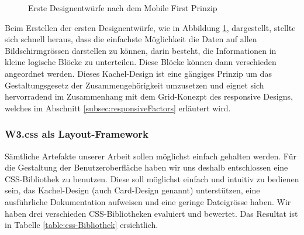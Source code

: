 \begin{figure}[h!]
	\centering
	\caption{Erste Designentwürfe nach dem Mobile First Prinzip}
	\label{img:scribbles}
\end{figure}

Beim Erstellen der ersten Designentwürfe, wie in Abbildung \ref{img:scribbles}, dargestellt, stellte sich schnell heraus, dass die einfachste Möglichkeit die Daten auf allen Bildschirmgrössen darstellen zu können, darin besteht, die Informationen in kleine logische Blöcke zu unterteilen. Diese Blöcke können dann verschieden angeordnet werden. Dieses Kachel-Design ist eine gängiges Prinzip um das Gestaltungsgesetz der Zusammengehörigkeit umzusetzen und eignet sich hervorradend im Zusammenhang mit dem Grid-Konezpt des responsive Designs, welches im Abschnitt \ref{subsec:responsiveFactors} erläutert wird.


\subsubsection{W3.css als Layout-Framework}
Sämtliche Artefakte unserer Arbeit sollen möglichst einfach gehalten werden. Für die Gestaltung der Benutzeroberfläche haben wir uns deshalb entschlossen eine CSS-Bibliothek zu benutzen. Diese soll möglichst einfach und intuitiv zu bedienen sein, das Kachel-Design (auch Card-Design genannt) unterstützen, eine ausführliche Dokumentation aufweisen und eine geringe Dateigrösse haben. Wir haben drei verschieden CSS-Bibliotheken evaluiert und bewertet. Das Resultat ist in Tabelle  \ref{table:css-Bibliothek} ersichtlich.

